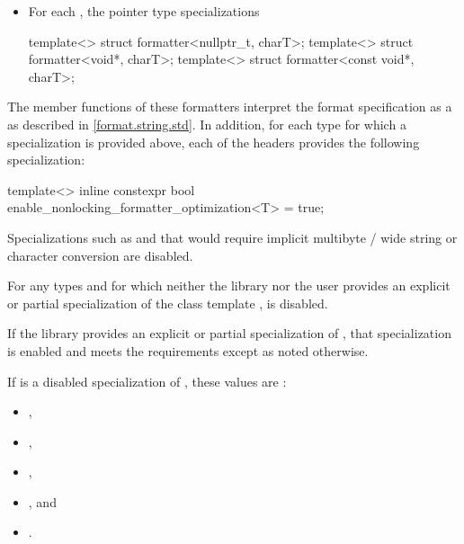 \documentclass{wg21}
\begin{document}
\begin{itemize}
    \item
    For each ,
    the pointer type specializations
    \begin{codeblock}
        template<> struct formatter<nullptr_t, charT>;
        template<> struct formatter<void*, charT>;
        template<> struct formatter<const void*, charT>;
    \end{codeblock}
\end{itemize}
The  member functions of these formatters
interpret the format specification
as a 
as described in \ref{format.string.std}.
In addition,
for each type  for which
a  specialization is provided above,
each of the headers provides the following specialization:
\begin{codeblock}
    template<> inline constexpr bool enable_nonlocking_formatter_optimization<T> = true;
\end{codeblock}
\begin{note}
    Specializations such as 
    and 
    that would require implicit
    multibyte / wide string or character conversion are disabled.
\end{note}

\pnum
For any types  and  for which
neither the library nor the user provides
an explicit or partial specialization of
the class template ,
 is disabled.

\pnum
If the library provides an explicit or partial specialization of
, that specialization is enabled
and meets the  requirements
except as noted otherwise.

\pnum
If  is a disabled specialization of , these
values are :
\begin{itemize}
    \item {},
    \item {},
    \item {},
    \item {}, and
    \item {}.
\end{itemize}
\end{document}
